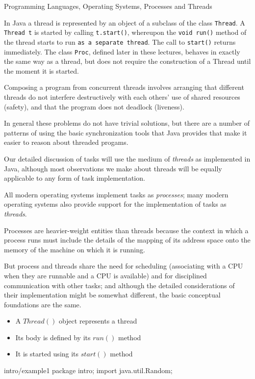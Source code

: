 \documentclass{concdistfoils}
\begin{document}
\begin{section}{Programming Languages, Operating Systems, Processes and Threads}
\begin{slide}
\begin{note}
In Java a thread is represented by an object of a subclass of the
class \texttt{Thread}.  A \texttt{Thread t} is started by calling
\texttt{t.start()}, whereupon the \texttt{void run()} method of the thread
starts to run \texttt{as a separate thread}.  The call to \texttt{start()}
returns immediately. The class \texttt{Proc}, defined later in these
lectures, behaves in exactly the same way as a thread, but does not
require the construction of a Thread until the moment it is started.

Composing a program from concurrent threads involves arranging that
different threads do not interfere destructively with each others' use
of shared resources (safety), and that the program does not deadlock
(liveness).

In general these problems do not have trivial solutions, but there are
a number of patterns of using the basic synchronization tools that Java
provides that make it easier to reason about threaded progams.


Our detailed discussion of tasks will use the medium of \textit{threads}
as implemented in Java, although most observations we make about threads
will be equally applicable to any form of task implementation.

All modern operating systems implement tasks as \textit{processes}; many
modern operating systems also provide support for the implementation of
tasks as \textit{threads}.

Processes are heavier-weight entities than threads because the context
in which a process runs must include the details of the mapping of its
address space onto the memory of the machine on which it is running.

But process and threads share the need for scheduling (associating with
a CPU when they are runnable and a CPU is available) and for disciplined
communication with other tasks; and although the detailed considerations
of their implementation might be somewhat different, the basic conceptual
foundations are the same.
\end{note}
\begin{itemize}
\item A $Thread()$ object represents a thread
\item Its body is defined by its $run()$ method
\item It is started using its $start()$ method
\end{itemize}
\vfill
\begin{hideclass}{intro/example1}
package intro;
import java.util.Random;


\end{hideclass}
\end{slide}
\end{section}
\end{document}
